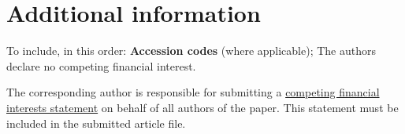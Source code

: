 \documentclass[fleqn,10pt]{wlscirep}
\begin{document}
\section*{Additional information}

To include, in this order: \textbf{Accession codes} (where
applicable); The authors declare no competing financial interest.

The corresponding author is responsible for submitting a
\href{http://www.nature.com/srep/policies/index.html#competing}{competing
  financial interests statement} on behalf of all authors of the
paper. This statement must be included in the submitted article file.
\end{document}
